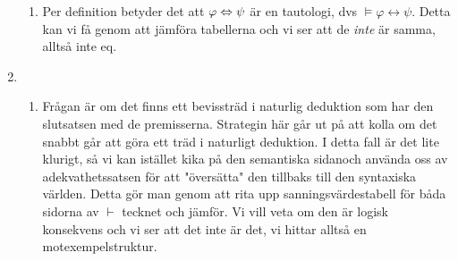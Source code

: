 \begin{enumerate}
\begin{enumerate}
      \item Per definition betyder det att $\varphi\Leftrightarrow\psi$ är en tautologi, dvs $\vDash\varphi\leftrightarrow\psi$. Detta kan vi få genom att jämföra tabellerna och vi ser att de \textit{inte} är samma, alltså inte eq.

    \end{enumerate}
    \par\bigskip

  \item
    \begin{enumerate}

      (Sekvent = Påstående)
      \par\bigskip

      \item Frågan är om det finns ett bevissträd i naturlig deduktion som har den slutsatsen med de premisserna. Strategin här går ut på att kolla om det snabbt går att göra ett träd i naturligt deduktion. I detta fall är det lite klurigt, så vi kan istället kika på den semantiska sidanoch använda oss av adekvathetssatsen för att "översätta" den tillbaks till den syntaxiska världen. Detta gör man genom att rita upp sanningsvärdestabell för båda sidorna av $\vdash$ tecknet och jämför. Vi vill veta om den är logisk konsekvens och vi ser att det inte är det, vi hittar alltså en motexempelstruktur.

    \end{enumerate}

\end{enumerate}
